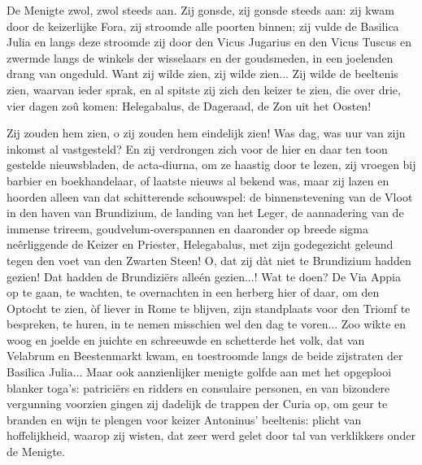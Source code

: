 \documentclass[a4paper, 12pt, oneside, dutch]{article}
\begin{document}
De Menigte zwol, zwol steeds aan. Zij gonsde, zij gonsde steeds aan: zij kwam door de keizerlijke Fora, zij stroomde alle poorten binnen; zij vulde de Basilica Julia en langs deze stroomde zij door den Vicus Jugarius en den Vicus Tuscus en zwermde langs de winkels der wisselaars en der goudsmeden, in een joelenden drang van ongeduld. Want zij wilde zien, zij wilde zien... Zij wilde de beeltenis zien, waarvan ieder sprak, en al spitste zij zich den keizer te zien, die over drie, vier dagen zoû komen: Helegabalus, de Dageraad, de Zon uit het Oosten!

Zij zouden hem zien, o zij zouden hem eindelijk zien! Was dag, was uur van zijn inkomst al vastgesteld? En zij verdrongen zich voor de hier en daar ten toon gestelde nieuwsbladen, de acta-diurna, om ze haastig door te lezen, zij vroegen bij barbier en boekhandelaar, of laatste nieuws al bekend was, maar zij lazen en hoorden alleen van dat schitterende schouwspel: de binnenstevening van de Vloot in den haven van Brundizium, de landing van het Leger, de aannadering van de immense trireem, goudvelum-overspannen en daaronder op breede sigma neêrliggende de Keizer en Priester, Helegabalus, met zijn godegezicht geleund tegen den voet van den Zwarten Steen! O, dat zij dàt niet te Brundizium hadden gezien! Dat hadden de Brundiziërs alleén gezien...! Wat te doen? De Via Appia op te gaan, te wachten, te overnachten in een herberg hier of daar, om den Optocht te zien, òf liever in Rome te blijven, zijn standplaats voor den Triomf te bespreken, te huren, in te nemen misschien wel den dag te voren... Zoo wikte en woog en joelde en juichte en schreeuwde en schetterde het volk, dat van Velabrum en Beestenmarkt kwam, en toestroomde langs de beide zijstraten der Basilica Julia... Maar ook aanzienlijker menigte golfde aan met het opgeplooi blanker toga's: patriciërs en ridders en consulaire personen, en van bizondere vergunning voorzien gingen zij dadelijk de trappen der Curia op, om geur te branden en wijn te plengen voor keizer Antoninus' beeltenis: plicht van hoffelijkheid, waarop zij wisten, dat zeer werd gelet door tal van verklikkers onder de Menigte.
\end{document}
